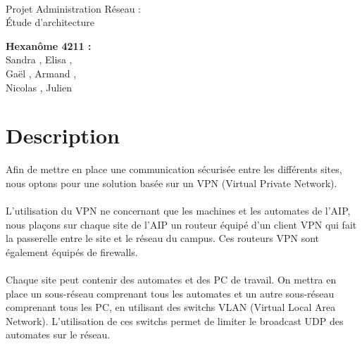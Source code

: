 \documentclass[a4paper]{article}
\begin{document}
\begin{titlepage}
	~ 
	\vfill
	\begin{center}
		\begin{Huge}
			Projet Administration Réseau : \\ Étude d'architecture\\
		\end{Huge}
	\vfill
		\textbf{Hexanôme 4211 :} 
			\\Sandra {}, Elisa , 
			\\Gaël , Armand , 
			\\Nicolas {}, Julien \\
	\vfill
	\end{center}
	\vfill
\end{titlepage}

\newpage


	\section{Description} %
	
	Afin de mettre en place une communication sécurisée entre les différents sites, nous optons pour une solution basée sur un VPN (Virtual Private Network). 
	
	\paragraph*{} %
	L'utilisation du VPN ne concernant que les machines et les automates de l'AIP, nous plaçons sur chaque site de l'AIP un routeur équipé d'un client VPN qui fait la passerelle entre le site et le réseau du campus. Ces routeurs VPN sont également équipés de firewalls. 
	
	\paragraph*{} %
	Chaque site peut contenir des automates et des PC de travail. On mettra en place un sous-réseau comprenant tous les automates et un autre sous-réseau comprenant tous les PC, en utilisant des switchs VLAN (Virtual Local Area Network). L'utilisation de ces switchs permet de limiter le broadcast UDP des automates sur le réseau. 
	
\end{document}
